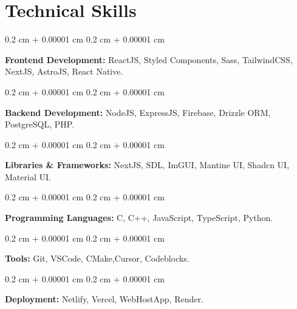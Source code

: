 \documentclass[10pt, letterpaper]{article}
\newenvironment{onecolentry}{
	\begin{adjustwidth}{
			0.2 cm + 0.00001 cm
		}{
			0.2 cm + 0.00001 cm
		}
	}{
	\end{adjustwidth}
} %
\begin{document}
	\section{Technical Skills}
	\begin{onecolentry}
		\textbf{Frontend Development:} ReactJS, Styled Components, Sass, TailwindCSS, NextJS, AstroJS, React Native.
	\end{onecolentry}
	\vspace{0.1cm}
	\begin{onecolentry}
		\textbf{Backend Development:} NodeJS, ExpressJS, Firebase, Drizzle ORM, PostgreSQL, PHP.
	\end{onecolentry}
	\vspace{0.1cm}
	\begin{onecolentry}
		\textbf{Libraries \& Frameworks:} NextJS, SDL, ImGUI, Mantine UI, Shadcn UI, Material UI.
	\end{onecolentry}
	\vspace{0.1cm}
	\begin{onecolentry}
		\textbf{Programming Languages:} C, C++, JavaScript, TypeScript, Python.
	\end{onecolentry}
	\vspace{0.1cm}
	\begin{onecolentry}
		\textbf{Tools:} Git, VSCode, CMake,Cursor, Codeblocks.
	\end{onecolentry}
	\vspace{0.1cm}
	\begin{onecolentry}
		\textbf{Deployment:} Netlify, Vercel, WebHostApp, Render.
	\end{onecolentry}
	
\end{document}
